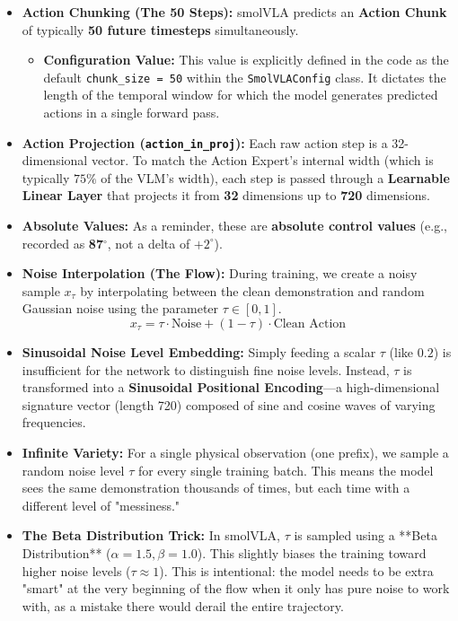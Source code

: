 \documentclass[11pt,a4paper]{article}
\begin{document}
\begin{itemize}
    \item \textbf{Action Chunking (The 50 Steps):} smolVLA predicts an \textbf{Action Chunk} of typically \textbf{50 future timesteps} simultaneously.
    \begin{itemize}
        \item \textbf{Configuration Value:} This value is explicitly defined in the code as the default \texttt{chunk\_size = 50} within the \texttt{SmolVLAConfig} class. It dictates the length of the temporal window for which the model generates predicted actions in a single forward pass.
    \end{itemize}
    \item \textbf{Action Projection (\texttt{action\_in\_proj}):} Each raw action step is a 32-dimensional vector. To match the Action Expert's internal width (which is typically $75\%$ of the VLM's width), each step is passed through a \textbf{Learnable Linear Layer} that projects it from \textbf{32} dimensions up to \textbf{720} dimensions.
    \item \textbf{Absolute Values:} As a reminder, these are \textbf{absolute control values} (e.g., recorded as \textbf{87}$^\circ$, not a delta of $+2^\circ$).
    \item \textbf{Noise Interpolation (The Flow):} During training, we create a noisy sample $x_\tau$ by interpolating between the clean demonstration and random Gaussian noise using the parameter $\tau \in [0, 1]$.
    \[ x_\tau = \tau \cdot \text{Noise} + (1 - \tau) \cdot \text{Clean Action} \]
    \item \textbf{Sinusoidal Noise Level Embedding:} Simply feeding a scalar $\tau$ (like $0.2$) is insufficient for the network to distinguish fine noise levels. Instead, $\tau$ is transformed into a \textbf{Sinusoidal Positional Encoding}—a high-dimensional signature vector (length 720) composed of sine and cosine waves of varying frequencies.
    \item \textbf{Infinite Variety:} For a single physical observation (one prefix), we sample a random noise level $\tau$ for every single training batch. This means the model sees the same demonstration thousands of times, but each time with a different level of "messiness."
    \item \textbf{The Beta Distribution Trick:} In smolVLA, $\tau$ is sampled using a **Beta Distribution** ($\alpha=1.5, \beta=1.0$). This slightly biases the training toward higher noise levels ($\tau \approx 1$). This is intentional: the model needs to be extra "smart" at the very beginning of the flow when it only has pure noise to work with, as a mistake there would derail the entire trajectory.

\end{itemize}
\end{document}
